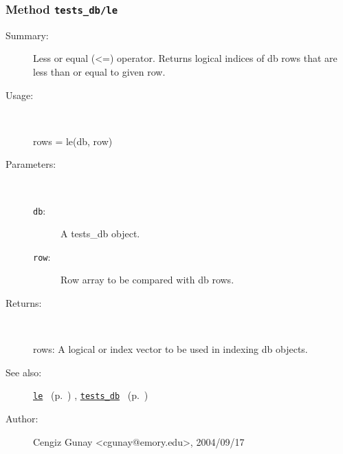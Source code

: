 \subsubsection[Method \texttt{le}]{Method \texttt{tests\_db/le}}%
%
\label{ref_tests_db__le}%
\hypertarget{ref_tests_db__le}{}%
\begin{description}
\item[Summary:]Less or equal (<=) operator. Returns logical indices of db rows 
	that are less than or equal to given row.
%
\item[Usage:]~%
\begin{lyxcode}%
rows = le(db, row)
%
\end{lyxcode}%
%
%
\item[Parameters:]~
\begin{description}%
\item[\texttt{db}:]
 A tests\_db object.
\item[\texttt{row}:]
 Row array to be compared with db rows.
\end{description}%
%
\item[Returns:
]~

	rows: A logical or index vector to be used in indexing db objects. 
%
%
\item[See also:]%
\hyperlink{ref_le}{\texttt{le}}%
\ (p.~\pageref{ref_le})%
%
, \hyperlink{ref_tests_db}{\texttt{tests\_db}}%
\ (p.~\pageref{ref_tests_db})%
%
%
\item[Author:]%
Cengiz Gunay <cgunay@emory.edu>, 2004/09/17
%
\end{description}
\methodline%
